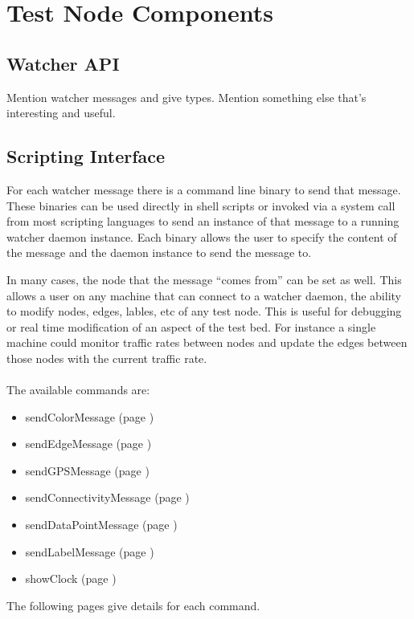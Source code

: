\documentclass{article}
\begin{document}
\section{Test Node Components}
\subsection{Watcher API}
Mention watcher messages and give types. Mention something else that's interesting and useful. 

\subsection{Scripting Interface}
For each watcher message there is a command line binary to send that message. These binaries can be used directly in shell scripts or invoked via a system call from most scripting languages to send 
an instance of that message to a running watcher daemon instance. Each binary allows the user to specify the content of the message and the daemon instance to send the message to. 

In many cases, the node that the message ``comes from'' can be set as well. This allows a user on any machine that can connect to a watcher daemon, the ability to modify nodes, edges, lables, etc of any 
test node. This is useful for debugging or real time modification of an aspect of the test bed. For instance a single machine could monitor traffic rates between nodes and update 
the edges between those nodes with the current traffic rate. 
\\\\
The available commands are:
\begin{itemize}
\item sendColorMessage (page \pageref{sendColorMessage})
\item sendEdgeMessage (page \pageref{sendEdgeMessage})
\item sendGPSMessage (page \pageref{sendGPSMessage})
\item sendConnectivityMessage (page \pageref{sendConnectivityMessage})
\item sendDataPointMessage (page \pageref{sendDataPointMessage})
\item sendLabelMessage (page \pageref{sendLabelMessage})
\item showClock (page \pageref{showClock})
\end{itemize}
The following pages give details for each command.







\end{document}
